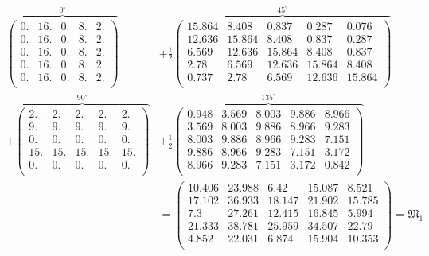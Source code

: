 \documentclass[slug=PET, room=Andreas-Schubert-Bau\,\ 424A,
supervisor=Carsten\ Bittrich, coursedate=10.\ 01.\ 2020, ngerman]{../../Lab_Report_LaTeX/lab_report}
\begin{document}
{\footnotesize
\setlength{\arraycolsep}{2.5pt}

\begin{align}
  \label{eq:simplerepr}
  \overbrace{\begin{pmatrix}
      0. & 16. & 0. & 8. & 2.\\
      0. & 16. & 0. & 8. & 2.\\
      0. & 16. & 0. & 8. & 2.\\
      0. & 16. & 0. & 8. & 2.\\
      0. & 16. & 0. & 8. & 2.\\
    \end{pmatrix}}^{0^\circ} & + \frac{1}{2}\overbrace{\begin{pmatrix}
      15.864 & 8.408 & 0.837 & 0.287 & 0.076\\
      12.636 & 15.864 & 8.408 & 0.837 & 0.287\\
      6.569 & 12.636 & 15.864 & 8.408 & 0.837\\
      2.78 & 6.569 & 12.636 & 15.864 & 8.408\\
      0.737 & 2.78 & 6.569 & 12.636 & 15.864\\
    \end{pmatrix}}^{45^\circ} \nonumber \\ + \overbrace{\begin{pmatrix}
      2. & 2. & 2. & 2. & 2.\\
      9. & 9. & 9. & 9. & 9.\\
      0. & 0. & 0. & 0. & 0.\\
      15. & 15. & 15. & 15. & 15.\\
      0. & 0. & 0. & 0. & 0.\\
    \end{pmatrix}}^{90^\circ} &+ \frac{1}{2}\overbrace{\begin{pmatrix}
      0.948 & 3.569 & 8.003 & 9.886 & 8.966\\
      3.569 & 8.003 & 9.886 & 8.966 & 9.283\\
      8.003 & 9.886 & 8.966 & 9.283 & 7.151\\
      9.886 & 8.966 & 9.283 & 7.151 & 3.172\\
      8.966 & 9.283 & 7.151 & 3.172 & 0.842\\
    \end{pmatrix}}^{135^\circ}\nonumber \\
  & = \begin{pmatrix}
  10.406 & 23.988 & 6.42 & 15.087 & 8.521\\
  17.102 & 36.933 & 18.147 & 21.902 & 15.785\\
  7.3 & 27.261 & 12.415 & 16.845 & 5.994\\
  21.333 & 38.781 & 25.959 & 34.507 & 22.79\\
  4.852 & 22.031 & 6.874 & 15.904 & 10.353\\
  \end{pmatrix} = \mathfrak{M}_1
\end{align}}
\end{document}
